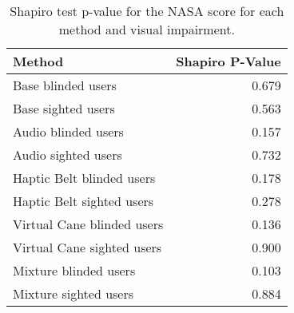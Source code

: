 
\begin{table}[!htb]
\centering
\caption{Shapiro test p-value for the NASA score for each method and visual impairment.}
\label{tab:shapiro_nasa_score}
\begin{tabular}{lr}
\toprule
                    Method &  Shapiro P-Value \\
\midrule
        Base blinded users &            0.679 \\
        Base sighted users &            0.563 \\
       Audio blinded users &            0.157 \\
       Audio sighted users &            0.732 \\
 Haptic Belt blinded users &            0.178 \\
 Haptic Belt sighted users &            0.278 \\
Virtual Cane blinded users &            0.136 \\
Virtual Cane sighted users &            0.900 \\
     Mixture blinded users &            0.103 \\
     Mixture sighted users &            0.884 \\
\bottomrule
\end{tabular}
\end{table}

